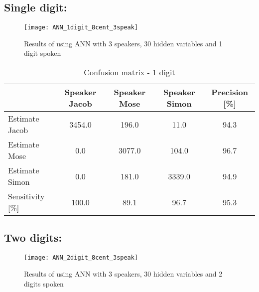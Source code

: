 \subsection{Single digit:}
\begin{figure}[H]
\centering
\texttt{[image: ANN\_1digit\_8cent\_3speak]}
\caption{Results of using ANN with 3 speakers, 30 hidden variables and 1 digit spoken}
\label{fig:ANN_fig_1}
\end{figure}

\begin{table}[H]                                                    
\centering                                                          
\begin{tabular}{|l|c|c|c|c|}                                        
\hline                                                              
  & Speaker Jacob & Speaker Mose & Speaker Simon & Precision [\%] \\
\hline                                                              
Estimate Jacob & 3454.0 & 196.0 & 11.0 & 94.3 \\                    
\hline                                                              
Estimate Mose & 0.0 & 3077.0 & 104.0 & 96.7 \\                      
\hline                                                              
Estimate Simon & 0.0 & 181.0 & 3339.0 & 94.9 \\                     
\hline                                                              
Sensitivity [\%] & 100.0 & 89.1 & 96.7 & 95.3 \\                    
\hline                                                              
\end{tabular}                                                       
\caption{Confusion matrix - 1 digit}                                
\label{table:ANN_conf_1}                                            
\end{table}  



\subsection{Two digits:}
\begin{figure}[H]
\centering
\texttt{[image: ANN\_2digit\_8cent\_3speak]}
\caption{Results of using ANN with 3 speakers, 30 hidden variables and 2 digits spoken}
\label{fig:ANN_fig_2}
\end{figure}

